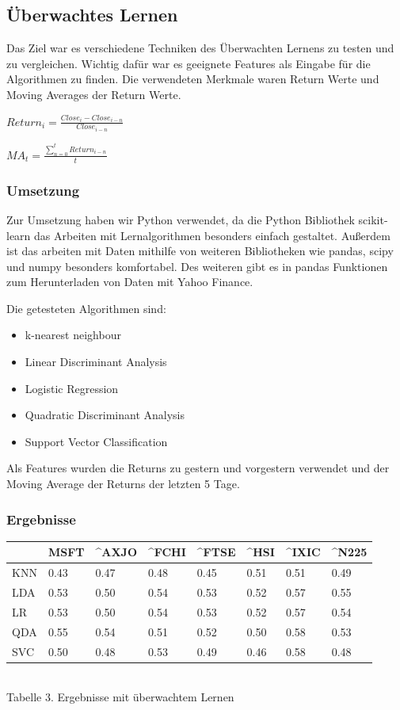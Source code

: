 \documentclass[12pt]{article} %
\begin{document}
\subsection{Überwachtes Lernen}

Das Ziel war es verschiedene Techniken des Überwachten Lernens zu testen und zu vergleichen. Wichtig dafür war es geeignete Features als Eingabe für die Algorithmen zu finden. Die verwendeten Merkmale waren Return Werte und Moving Averages der Return Werte.

$Return_i = \frac{Close_i - Close_{i-n}}{Close_{i-n}}$

$MA_t = \frac{\sum\limits_{n=0}^t Return_{i-n}}{t}$

\subsubsection{Umsetzung}

Zur Umsetzung haben wir Python verwendet, da die Python Bibliothek scikit-learn das
Arbeiten mit Lernalgorithmen besonders einfach gestaltet. Außerdem ist das arbeiten mit
Daten mithilfe von weiteren Bibliotheken wie pandas, scipy und numpy besonders 
komfortabel. Des weiteren gibt es in pandas Funktionen zum Herunterladen von Daten mit
Yahoo Finance.

Die getesteten Algorithmen sind:

\begin{itemize}
\item k-nearest neighbour 
\item Linear Discriminant Analysis
\item Logistic Regression
\item Quadratic Discriminant Analysis
\item Support Vector Classification
\end{itemize}

Als Features wurden die Returns zu gestern und vorgestern verwendet und der Moving Average der Returns der letzten 5 Tage.

\subsubsection{Ergebnisse}

\begin{center}
\begin{tabularx}{\textwidth}{|X|X|X|X|X|X|X|X|}
\hline
& MSFT & \^{}AXJO & \^{}FCHI & \^{}FTSE & \^{}HSI & \^{}IXIC & \^{}N225 \\
\hline
KNN & 0.43 & 0.47 & 0.48 & 0.45 & 0.51 & 0.51 & 0.49 \\
LDA & 0.53 & 0.50 & 0.54 & 0.53 & 0.52 & 0.57 & 0.55 \\
LR  & 0.53 & 0.50 & 0.54 & 0.53 & 0.52 & 0.57 & 0.54 \\
QDA & 0.55 & 0.54 & 0.51 & 0.52 & 0.50 & 0.58 & 0.53 \\
SVC & 0.50 & 0.48 & 0.53 & 0.49 & 0.46 & 0.58 & 0.48 \\
\hline
\end{tabularx}
\\[5pt]
Tabelle 3. Ergebnisse mit überwachtem Lernen
\end{center}
\end{document}
